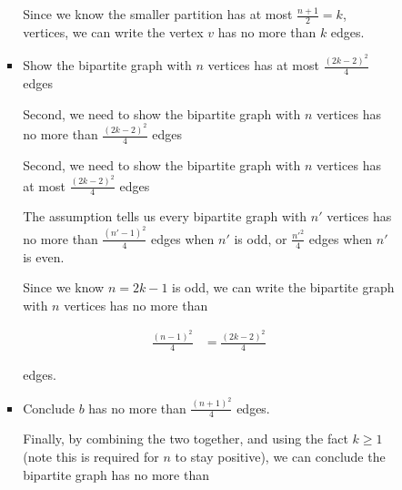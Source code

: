 \documentclass[12pt]{article}
\begin{document}
\begin{enumerate}[a.]
\begin{mdframed}
\begin{enumerate}[1.]
\begin{enumerate}[1.]
\begin{itemize}
\begin{mdframed}
                    \bigskip

                    Since we know the smaller partition has at most $\frac{n+1}{2} = k$,
                    vertices, we can write the vertex $v$ has no more than $k$ edges.

                    \end{mdframed}

                    \item Show the bipartite graph with $n$ vertices has
                    at most $\frac{(2k-2)^2}{4}$ edges

                    \bigskip

                    Second, we need to show the bipartite graph with $n$ vertices has
                    no more than $\frac{(2k-2)^2}{4}$ edges

                    \bigskip

                    \begin{mdframed}
                    Second, we need to show the bipartite graph with $n$ vertices has
                    at most $\frac{(2k-2)^2}{4}$ edges

                    \bigskip

                    The assumption tells us every bipartite graph with $n'$ vertices
                    has no more than $\frac{(n'-1)^2}{4}$ edges when $n'$ is odd, or
                    $\frac{n'^2}{4}$ edges when $n'$ is even.

                    \bigskip

                    Since we know $n = 2k - 1$ is odd, we can write the bipartite
                    graph with $n$ vertices has no more than

                    \begin{align}
                        \frac{(n-1)^2}{4} &= \frac{(2k-2)^2}{4}
                    \end{align}

                    edges.
                    \end{mdframed}

                    \item Conclude $b$ has no more than $\frac{(n+1)^2}{4}$ edges.

                    \begin{mdframed}
                    Finally, by combining the two together, and using the fact $k \geq 1$
                    (note this is required for $n$ to stay positive), we can
                    conclude the bipartite graph has no more than


\end{mdframed}
\end{itemize}
\end{enumerate}
\end{enumerate}
\end{mdframed}
\end{enumerate}
\end{document}

